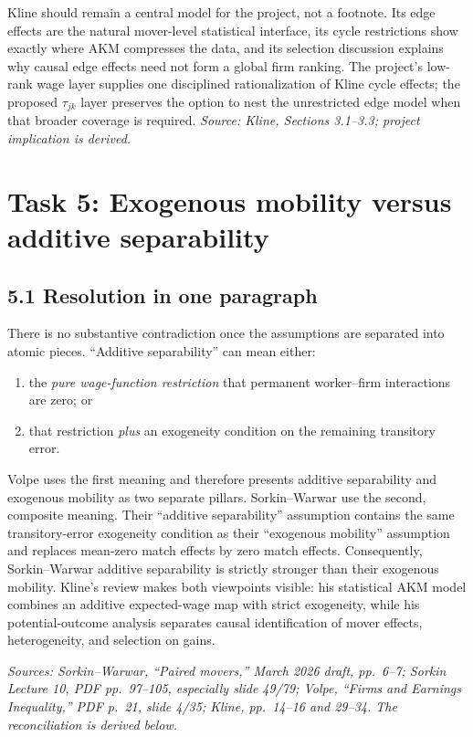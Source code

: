 \documentclass[11pt]{article}
\begin{document}
Kline should remain a central model for the project, not a footnote.  Its edge
effects are the natural mover-level statistical interface, its cycle
restrictions show exactly where AKM compresses the data, and its selection
discussion explains why causal edge effects need not form a global firm
ranking.  The project's low-rank wage layer supplies one disciplined
rationalization of Kline cycle effects; the proposed \(\tau_{jk}\) layer
preserves the option to nest the unrestricted edge model when that broader
coverage is required.
\textit{Source: Kline, Sections 3.1--3.3; project implication is derived.}

\clearpage
\section{Task 5: Exogenous mobility versus additive separability}

\subsection{5.1 Resolution in one paragraph}

There is no substantive contradiction once the assumptions are separated into
atomic pieces.  ``Additive separability'' can mean either:

\begin{enumerate}
\item the \emph{pure wage-function restriction} that permanent worker--firm
  interactions are zero; or
\item that restriction \emph{plus} an exogeneity condition on the remaining
  transitory error.
\end{enumerate}

Volpe uses the first meaning and therefore presents additive separability and
exogenous mobility as two separate pillars.  Sorkin--Warwar use the second,
composite meaning.  Their ``additive separability'' assumption contains the
same transitory-error exogeneity condition as their ``exogenous mobility''
assumption and replaces mean-zero match effects by zero match effects.
Consequently, Sorkin--Warwar additive separability is strictly stronger than
their exogenous mobility.  Kline's review makes both viewpoints visible:
his statistical AKM model combines an additive expected-wage map with strict
exogeneity, while his potential-outcome analysis separates causal
identification of mover effects, heterogeneity, and selection on gains.

\textit{Sources: Sorkin--Warwar, ``Paired movers,'' March 2026 draft,
pp.\ 6--7; Sorkin Lecture 10, PDF pp.\ 97--105, especially slide 49/79;
Volpe, ``Firms and Earnings Inequality,'' PDF p.\ 21, slide 4/35; Kline,
pp.\ 14--16 and 29--34.  The reconciliation is derived below.}
\end{document}
